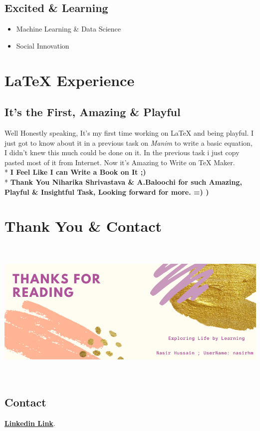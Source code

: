 \documentclass[12pt]{article}
\begin{document}
\subsection{Excited \& Learning}
\begin{itemize}
  \item Machine Learning \& Data Science
  \item Social Innovation
\end{itemize}

\section{LaTeX Experience}
\subsection{It's the First, Amazing \& Playful}
Well Honestly speaking, It's my first time working on LaTeX and being playful. I just got to know about it in a previous task on \textit{Manim} to write a basic equation, I didn't knew this much could be done on it. In the previous task i just copy pasted most of it from Internet. Now it's Amazing to Write on TeX Maker.
\\*
\newline
\textbf{I Feel Like I can Write a Book on It ;)}
\\*
\newline
\textbf{Thank You Niharika Shrivastava \& A.Baloochi for such Amazing, Playful \& Insightful Task, Looking forward for more. =) )}

\section{Thank You \& Contact}
\includegraphics[width=15 cm, height=7cm]{thanks}
\subsection{Contact}
\textcolor{myURL}{\href{https://www.linkedin.com/in/nasirhm/}{\textbf{Linkedin Link}}.}
\end{document}

